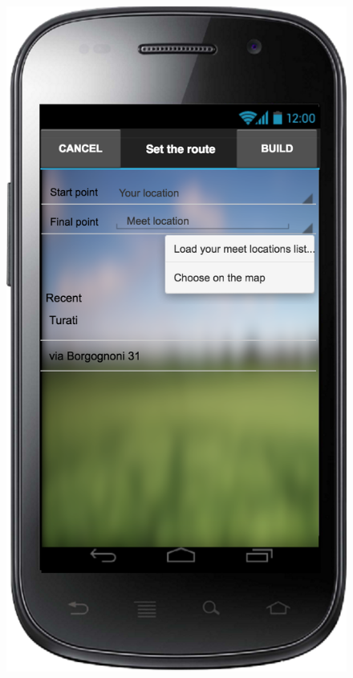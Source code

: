 \documentclass[a4paper,leqno]{article}
\begin{document}
\begin{figure}
	\begin{minipage}[!h]{0.45\linewidth}
		\centering
		\includegraphics[scale = 0.15]{setRoute.png}
	\end{minipage}
	
	\vspace{3.5 cm}
	

\end{figure}
\end{document}
